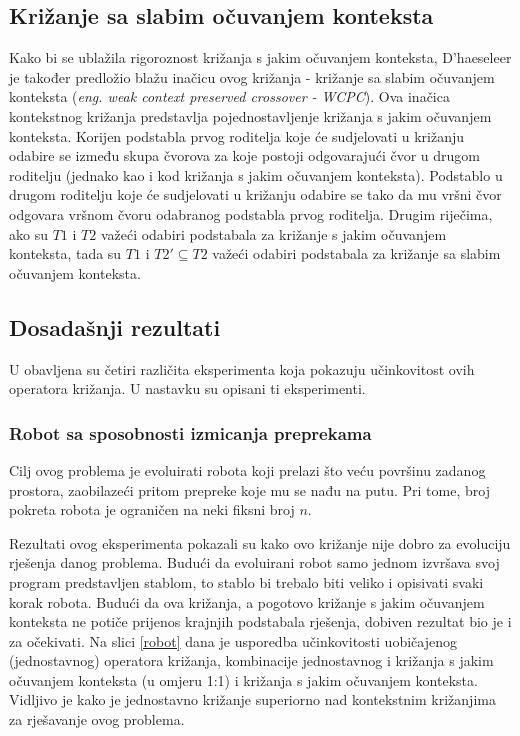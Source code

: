 \subsection{Križanje sa slabim očuvanjem konteksta}
Kako bi se ublažila rigoroznost križanja s jakim očuvanjem konteksta, D'haeseleer \cite{crxContext} je također predložio blažu inačicu ovog križanja - križanje sa slabim očuvanjem konteksta (\textit{eng. weak context preserved crossover - WCPC}). Ova inačica kontekstnog križanja predstavlja pojednostavljenje križanja s jakim očuvanjem konteksta. Korijen podstabla prvog roditelja koje će sudjelovati u križanju odabire se između skupa čvorova za koje postoji odgovarajući čvor u drugom roditelju (jednako kao i kod križanja s jakim očuvanjem konteksta). Podstablo u drugom roditelju koje će sudjelovati u križanju odabire se tako da mu vršni čvor odgovara vršnom čvoru odabranog podstabla prvog roditelja. Drugim riječima, ako su $T1$ i $T2$ važeći odabiri podstabala za križanje s jakim očuvanjem konteksta, tada su $T1$ i $T2' \subseteq T2$ važeći odabiri podstabala za križanje sa slabim očuvanjem konteksta.

\subsection{Dosadašnji rezultati}
U \cite{crxContext} obavljena su četiri različita eksperimenta koja pokazuju učinkovitost ovih operatora križanja. U nastavku su opisani ti eksperimenti.

\subsubsection{Robot sa sposobnosti izmicanja preprekama}
Cilj ovog problema je evoluirati robota koji prelazi što veću površinu zadanog prostora, zaobilazeći pritom prepreke koje mu se nađu na putu. Pri tome, broj pokreta robota je ograničen na neki fiksni broj $n$. 

Rezultati ovog eksperimenta pokazali su kako ovo križanje nije dobro za evoluciju rješenja danog problema. Budući da evoluirani robot samo jednom izvršava svoj program predstavljen stablom, to stablo bi trebalo biti veliko i opisivati svaki korak robota. Budući da ova križanja, a pogotovo križanje s jakim očuvanjem konteksta ne potiče prijenos krajnjih podstabala rješenja, dobiven rezultat bio je i za očekivati. Na slici \ref{robot} dana je usporedba učinkovitosti uobičajenog (jednostavnog) operatora križanja, kombinacije jednostavnog i križanja s jakim očuvanjem konteksta (u omjeru 1:1) i križanja s jakim očuvanjem konteksta. Vidljivo je kako je jednostavno križanje superiorno nad kontekstnim križanjima za rješavanje ovog problema.

